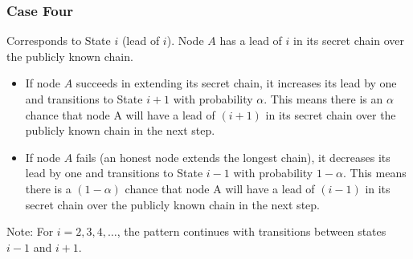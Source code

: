
\subsubsection{Case Four}
Corresponds to State $i$ (lead of $i$). Node $A$ has a lead of $i$ in its secret chain over the publicly known chain.
\begin{itemize}
    \item If node $A$ succeeds in extending its secret chain, it increases its lead by one and transitions to State $i+1$ with probability $\alpha$. This means there is an $\alpha$ chance that node A will have a lead of $(i+1)$ in its secret chain over the publicly known chain in the next step.
    \item If node $A$ fails (an honest node extends the longest chain), it decreases its lead by one and transitions to State $i-1$ with probability $1 - \alpha$. This means there is a $(1 - \alpha)$ chance that node A will have a lead of $(i-1)$ in its secret chain over the publicly known chain in the next step.
\end{itemize}


Note: For $i=2, 3, 4, \ldots$, the pattern continues with transitions between states $i-1$ and $i+1$.\\

